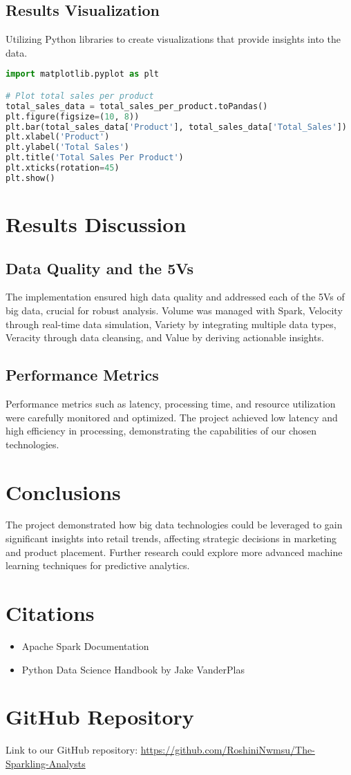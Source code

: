 \documentclass{article}
\begin{document}
\subsection{Results Visualization}
Utilizing Python libraries to create visualizations that provide insights into the data.
\begin{lstlisting}[language=Python]
import matplotlib.pyplot as plt

# Plot total sales per product
total_sales_data = total_sales_per_product.toPandas()
plt.figure(figsize=(10, 8))
plt.bar(total_sales_data['Product'], total_sales_data['Total_Sales'])
plt.xlabel('Product')
plt.ylabel('Total Sales')
plt.title('Total Sales Per Product')
plt.xticks(rotation=45)
plt.show()
\end{lstlisting}

\section{Results Discussion}
\subsection{Data Quality and the 5Vs}
The implementation ensured high data quality and addressed each of the 5Vs of big data, crucial for robust analysis. Volume was managed with Spark, Velocity through real-time data simulation, Variety by integrating multiple data types, Veracity through data cleansing, and Value by deriving actionable insights.

\subsection{Performance Metrics}
Performance metrics such as latency, processing time, and resource utilization were carefully monitored and optimized. The project achieved low latency and high efficiency in processing, demonstrating the capabilities of our chosen technologies.

\section{Conclusions}
The project demonstrated how big data technologies could be leveraged to gain significant insights into retail trends, affecting strategic decisions in marketing and product placement. Further research could explore more advanced machine learning techniques for predictive analytics.

\section{Citations}
\begin{itemize}
    \item Apache Spark Documentation
    \item Python Data Science Handbook by Jake VanderPlas
\end{itemize}

\section{GitHub Repository}
Link to our GitHub repository: \url{https://github.com/RoshiniNwmsu/The-Sparkling-Analysts}
\end{document}

